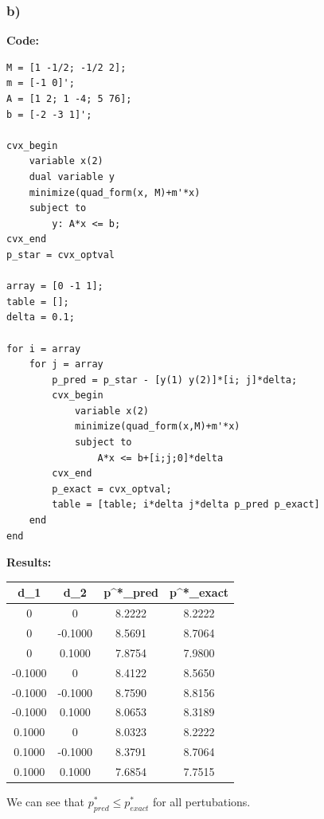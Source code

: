 \documentclass[12pt]{article}
\begin{document}
\subsubsection*{b)}
\textbf{Code:}
\begin{lstlisting}
M = [1 -1/2; -1/2 2];
m = [-1 0]';
A = [1 2; 1 -4; 5 76];
b = [-2 -3 1]';

cvx_begin
    variable x(2)
    dual variable y
    minimize(quad_form(x, M)+m'*x)
    subject to
        y: A*x <= b;
cvx_end
p_star = cvx_optval

array = [0 -1 1];
table = [];
delta = 0.1;

for i = array
    for j = array
        p_pred = p_star - [y(1) y(2)]*[i; j]*delta;
        cvx_begin
            variable x(2)
            minimize(quad_form(x,M)+m'*x)
            subject to
                A*x <= b+[i;j;0]*delta
        cvx_end
        p_exact = cvx_optval;
        table = [table; i*delta j*delta p_pred p_exact]
    end
end
\end{lstlisting}
\textbf{Results:}
\begin{center}
  \begin{tabular}{ | c | c | c | c |}
  \hline
    d_1 & d_2 & p^*_{pred} & p^*_{exact} \\ \hline
    0 &        0  &  8.2222  &  8.2222 \\ \hline
    0&   -0.1000    &8.5691   & 8.7064 \\ \hline
    0    &0.1000    &7.8754    &7.9800 \\ \hline
    -0.1000&         0 &   8.4122 &    8.5650 \\ \hline
    -0.1000&   -0.1000  &  8.7590  &  8.8156 \\ \hline
    -0.1000&    0.1000  &  8.0653  &  8.3189 \\ \hline
    0.1000 &        0   & 8.0323   & 8.2222 \\ \hline
    0.1000 &  -0.1000    &8.3791   & 8.7064 \\ \hline
    0.1000 &   0.1000   & 7.6854   & 7.7515 \\ \hline
  \end{tabular}
\end{center}
We can see that $p^*_{pred} \le p^*_{exact}$ for all pertubations.



 
\end{document}
